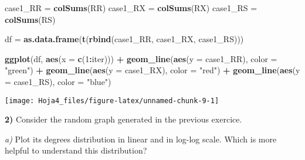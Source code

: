 \documentclass[
]{article}
\newenvironment{Shaded}{\begin{snugshade}}{\end{snugshade}}
\newcommand{\DataTypeTok}[1]{\textcolor[rgb]{0.13,0.29,0.53}{#1}}
\newcommand{\DecValTok}[1]{\textcolor[rgb]{0.00,0.00,0.81}{#1}}
\newcommand{\KeywordTok}[1]{\textcolor[rgb]{0.13,0.29,0.53}{\textbf{#1}}}
\newcommand{\NormalTok}[1]{#1}
\newcommand{\OperatorTok}[1]{\textcolor[rgb]{0.81,0.36,0.00}{\textbf{#1}}}
\newcommand{\StringTok}[1]{\textcolor[rgb]{0.31,0.60,0.02}{#1}}
\begin{document}
\begin{Shaded}
\begin{Highlighting}[]
\NormalTok{case1\_RR =}\StringTok{ }\KeywordTok{colSums}\NormalTok{(RR)}
\NormalTok{case1\_RX =}\StringTok{ }\KeywordTok{colSums}\NormalTok{(RX)}
\NormalTok{case1\_RS =}\StringTok{ }\KeywordTok{colSums}\NormalTok{(RS)}

\NormalTok{df =}\StringTok{ }\KeywordTok{as.data.frame}\NormalTok{(}\KeywordTok{t}\NormalTok{(}\KeywordTok{rbind}\NormalTok{(case1\_RR, case1\_RX, case1\_RS)))}

\KeywordTok{ggplot}\NormalTok{(df, }\KeywordTok{aes}\NormalTok{(}\DataTypeTok{x =} \KeywordTok{c}\NormalTok{(}\DecValTok{1}\OperatorTok{:}\NormalTok{iter))) }\OperatorTok{+}
\StringTok{  }\KeywordTok{geom\_line}\NormalTok{(}\KeywordTok{aes}\NormalTok{(}\DataTypeTok{y =}\NormalTok{ case1\_RR), }\DataTypeTok{color =} \StringTok{"green"}\NormalTok{) }\OperatorTok{+}
\StringTok{  }\KeywordTok{geom\_line}\NormalTok{(}\KeywordTok{aes}\NormalTok{(}\DataTypeTok{y =}\NormalTok{ case1\_RX), }\DataTypeTok{color =} \StringTok{"red"}\NormalTok{) }\OperatorTok{+}
\StringTok{  }\KeywordTok{geom\_line}\NormalTok{(}\KeywordTok{aes}\NormalTok{(}\DataTypeTok{y =}\NormalTok{ case1\_RS), }\DataTypeTok{color =} \StringTok{"blue"}\NormalTok{)}
\end{Highlighting}
\end{Shaded}

\begin{center}\texttt{[image: Hoja4\_files/figure-latex/unnamed-chunk-9-1]} \end{center}

\textbf{2)} Consider the random graph generated in the previous
exercice.

\emph{a)} Plot its degrees distribution in linear and in log-log scale.
Which is more helpful to understand this distribution?
\end{document}
